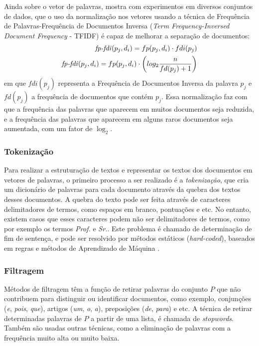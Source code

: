 \documentclass[normaltoc, espacoumemeio, pnumromarab,ruledheader]{abnt}
\begin{document}
    Ainda sobre o vetor de palavras,  mostra com experimentos em diversos conjuntos de dados, que o uso da normalização nos vetores usando a técnica de Frequência de Palavras-Frequência de Documentos Inversa (\textit{Term Frequency-Inversed Document Frequency} - TFIDF) é capaz de melhorar a separação de documentos:
    \begin{equation}
    \begin{split}
        \text{\textit{fp-fdi}}(p_j, d_i) = fp(p_j, d_i) \cdot fdi(p_j) \\
        \text{\textit{fp-fdi}}(p_j, d_i) = fp(p_j, d_i) \cdot \left( log_{2} \frac{n}{fd(p_j) + 1} \right)
    \end{split}
    \end{equation}
    em que $fdi(p_j)$ representa a Frequência de Documentos Inversa da palavra $p_j$ e $fd(p_j)$ a frequência de documentos que contém $p_j$. Essa normalização faz com que a frequência das palavras que aparecem em muitos documentos seja reduzida, e a frequência das palavras que aparecem em alguns raros documentos seja aumentada, com um fator de $\log_{2}$.

    \subsubsection{Tokenização}

    Para realizar a estruturação de textos e representar os textos dos documentos em vetores de palavras, o primeiro processo a ser realizado é a \textit{tokenização}, que cria um dicionário de palavras para cada documento através da quebra dos textos desses documentos.
    A quebra do texto pode ser feita através de caracteres delimitadores de termos, como espaços em branco, pontuações e etc. No entanto, existem casos que esses caracteres podem não ser delimitadores de termos, como por exemplo os termos \textit{Prof.} e \textit{Sr.}.
    Este problema é chamado de determinação de fim de sentença, e pode ser resolvido por métodos estáticos (\textit{hard-coded}), baseados em regras e métodos de Aprendizado de Máquina \cite{Weiss2010}.

    \subsubsection{Filtragem}

    Métodos de filtragem têm a função de retirar palavras do conjunto $P$ que não contribuem para distinguir ou identificar documentos, como exemplo, conjunções (\textit{e}, \textit{pois}, \textit{que}), artigos (\textit{um}, \textit{o}, \textit{a}), preposições (\textit{de}, \textit{para}) e etc.
    A técnica de retirar determinadas palavras de $P$ a partir de uma lista, é chamada de \textit{stopwords}.
    Também são usadas outras técnicas, como a eliminação de palavras com a frequência muito alta ou muito baixa.
\end{document}
